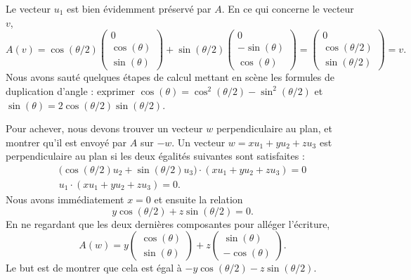 \begin{subproof}
        Le vecteur \( u_1\) est bien évidemment préservé par \( A\). En ce qui concerne le vecteur \( v\),
        \begin{equation}
            A(v)=\cos(\theta/2)\begin{pmatrix}
                0    \\
                \cos(\theta)    \\
                \sin(\theta)
            \end{pmatrix}+\sin(\theta/2)\begin{pmatrix}
                0    \\
                -\sin(\theta)    \\
                \cos(\theta)
            \end{pmatrix}=
            \begin{pmatrix}
                0    \\
                \cos(\theta/2)    \\
                \sin(\theta/2)
            \end{pmatrix}=v.
        \end{equation}
        Nous avons sauté quelques étapes de calcul mettant en scène les formules de duplication d'angle : exprimer \( \cos(\theta)=\cos^2(\theta/2)-\sin^2(\theta/2)\) et \( \sin(\theta)=2\cos(\theta/2)\sin(\theta/2)\).

        Pour achever, nous devons trouver un vecteur \( w\) perpendiculaire au plan, et montrer qu'il est envoyé par \( A\) sur \( -w\). Un vecteur \( w=xu_1+yu_2+zu_3\) est perpendiculaire au plan si les deux égalités suivantes sont satisfaites :
        \begin{subequations}
            \begin{align}
                \big( \cos(\theta/2)u_2+\sin(\theta/2)u_3 \big)\cdot (xu_1+yu_2+zu_3)=0\\
                u_1\cdot(xu_1+yu_2+zu_3)=0.
            \end{align}
        \end{subequations}
        Nous avons immédiatement \( x=0\) et ensuite la relation
        \begin{equation}        \label{EQooXQMDooTvwrWk}
            y\cos(\theta/2)+z\sin(\theta/2)=0.
        \end{equation}
        En ne regardant que les deux dernières composantes pour alléger l'écriture,
        \begin{equation}
            A(w)=y\begin{pmatrix}
                \cos(\theta)    \\
                \sin(\theta)
            \end{pmatrix}+z\begin{pmatrix}
                \sin(\theta)    \\
                -\cos(\theta)
            \end{pmatrix}.
        \end{equation}
        Le but est de montrer que cela est égal à \( -y\cos(\theta/2)-z\sin(\theta/2)\).


\end{subproof}
